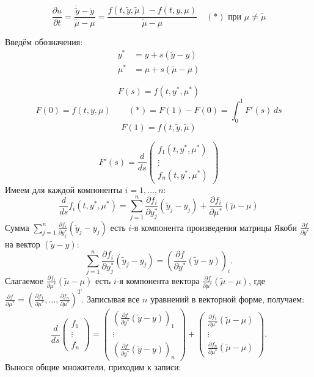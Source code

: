 \documentclass[a4paper,12pt]{article}
\begin{document}
\[
    \frac{\partial u}{\partial t} = \frac{\dot{\tilde{y}} - \dot{y}}{\tilde{\mu} - \mu} = \frac{f(t, \tilde{y}, \tilde{\mu}) - f(t, y, \mu)}{\tilde{\mu} - \mu} \quad (*) \text{ при } \mu \neq \tilde{\mu}
\]

Введём обозначения:
\[
    \begin{aligned} 
        y^* &= y + s(\tilde{y} - y) \\ 
        \mu^* &= \mu + s(\tilde{\mu} - \mu) 
    \end{aligned}
\]

\[
    F(s) = f(t, y^*, \mu^*)
\]
\[
    F(0) = f(t, y, \mu) \qquad (*) = F(1) - F(0) = \int_0^1 F'(s) \, ds
\]
\[
    F(1) = f(t, \tilde{y}, \tilde{\mu})
\]

\[
    F'(s) = \frac{d}{ds} \begin{pmatrix} f_1(t, y^*, \mu^*) \\ \vdots \\ f_n(t, y^*, \mu^*) \end{pmatrix}
\]
Имеем для каждой компоненты $i = 1,\dots,n$:
\[
    \frac{d}{ds} f_i(t, y^*, \mu^*) = \sum_{j=1}^n \frac{\partial f_i}{\partial y_j^*} (\tilde{y}_j - y_j) + \frac{\partial f_i}{\partial \mu^*} (\tilde{\mu} - \mu)
\]
Сумма $\sum_{j=1}^n \frac{\partial f_i}{\partial y_j^*} (\tilde{y}_j - y_j)$ есть $i$-я компонента произведения матрицы Якоби $\frac{\partial f}{\partial y^*}$ на вектор $(\tilde{y} - y)$:
\[
\sum_{j=1}^n \frac{\partial f_i}{\partial y_j^*} (\tilde{y}_j - y_j) = \left( \frac{\partial f}{\partial y^*} (\tilde{y} - y) \right)_i.
\]
Слагаемое $\frac{\partial f_i}{\partial \mu^*} (\tilde{\mu} - \mu)$ есть $i$-я компонента вектора $\frac{\partial f}{\partial \mu^*} (\tilde{\mu} - \mu)$, где 
$\frac{\partial f}{\partial \mu^*} = \left( \frac{\partial f_1}{\partial \mu^*}, \dots, \frac{\partial f_n}{\partial \mu^*} \right)^T$.
Записывая все $n$ уравнений в векторной форме, получаем:
\[
\frac{d}{ds} \begin{pmatrix} f_1 \\ \vdots \\ f_n \end{pmatrix}
= \begin{pmatrix}
\left( \frac{\partial f}{\partial y^*} (\tilde{y} - y) \right)_1 \\ \vdots \\ \left( \frac{\partial f}{\partial y^*} (\tilde{y} - y) \right)_n
\end{pmatrix}
+ \begin{pmatrix}
\frac{\partial f_1}{\partial \mu^*} (\tilde{\mu} - \mu) \\ \vdots \\ \frac{\partial f_n}{\partial \mu^*} (\tilde{\mu} - \mu)
\end{pmatrix}.
\]
Вынося общие множители, приходим к записи:
\end{document}
